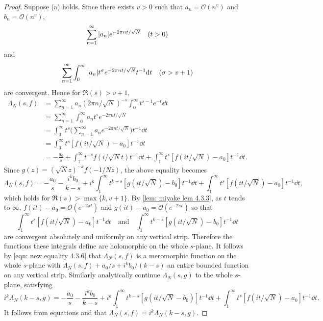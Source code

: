 \documentclass[10pt,leqno,twoside]{article}
\theoremstyle{plain}
\theoremstyle{definition}
\numberwithin{equation}{section}
\numberwithin{lem}{section}
\begin{document}
\begin{proof}
    Suppose (a) holds. Since there exists $v>0$ such that $a_n = \mathcal O(n^v)$ and $b_n = \mathcal O(n^v)$, 
    \[\sum_{n=1}^\infty \abs{a_n}e^{-2\pi n t/\sqrt{N}}\quad (t>0)\] and 
    \[\sum_{n=1}^\infty \int_0^\infty \abs{a_n}t^\sigma e^{-2\pi n t/\sqrt{N}}t^{-1}\dd t \quad (\sigma > v+1)\] are convergent. Hence for $\Re(s)>v+1$, 
    \begin{align*}
        \varLambda_N(s,f) &= \sum_{n=1}^\infty a_n(2\pi n/\sqrt{N})^{-s}\int_0^\infty t^{s-1}e^{-t}\dd t\\
        &= \sum_{n=1}^\infty \int_0^\infty a_nt^s e^{-2\pi n t/\sqrt{N}}\\
        &= \int_0^\infty t^s\bigg(\sum_{n=1}^\infty a_n e^{-2\pi nt /\sqrt{N}}\bigg)t^{-1}\dd t\\
        &= \int_0^\infty t^s[f(it/\sqrt{N}) - a_0]t^{-1}\dd t\\
        &= -\frac{a_0}{s} + \int_1^\infty t^{-s}f(i/\sqrt{N}t)t^{-1}\dd t + \int_1^\infty t^s[f(it/\sqrt{N}) - a_0]t^{-1}\dd t.
    \end{align*}
    Since $g(z) = (\sqrt{N}z)^{-k}f(-1/Nz)$, the above equality becomes 
    \begin{equation}\label{eqn: new equality 4.3.6}
        \varLambda_N(s,f) = -\frac{a_0}{s} - \frac{i^kb_0}{k-s} + i^k\int_1^\infty t^{k-s}[g(it/\sqrt{N})-b_0]t^{-1}\dd t + \int_1^\infty t^s[f(it/\sqrt{N}) - a_0]t^{-1}\dd t,
    \end{equation} which holds for $\Re(s)>\max\{k,v+1\}$. By \cref{lem: miyake lem 4.3.3}, as $t$ tends to $\infty$, $f(it)-a_0 = \mathcal O(e^{-2\pi t})$ and $g(it)-a_0 = \mathcal O(e^{-2\pi t})$ so that 
    \[\int_1^\infty t^s[f(it/\sqrt{N}) - a_0]t^{-1}\dd t\quad\text{and}\quad \int_1^\infty t^{k-s}[g(it/\sqrt{N})-b_0]t^{-1}\dd t\] are convergent absolutely and uniformly on any vertical strip. Therefore the functions these integrals define are holomorphic on the whole $s$-plane. It follows by \cref{eqn: new equality 4.3.6} that $\varLambda_N(s,f)$ is a meromorphic function on the whole $s$-plane with $\varLambda_N(s,f) + a_0/s+i^kb_0/(k-s)$ an entire bounded function on any vertical strip. Similarly analytically continue $\varLambda_N(s,g)$ to the whole $s$-plane, satisfying 
    \begin{equation}\label{eqn: similar for g 4.3.6}
        i^k\varLambda_N(k-s,g) = -\frac{a_0}{s}-\frac{i^kb_0}{k-s} + i^k\int_1^\infty t^{k-s}[g(it/\sqrt{N}-b_0)]t^{-1}\dd t + \int_1^\infty t^s[f(it/\sqrt{N})-a_0]t^{-1}\dd t.
    \end{equation}
    It follows from equations  and  that $\varLambda_N(s,f) = i^k\varLambda_N(k-s,g)$.


\end{proof}
\end{document}
